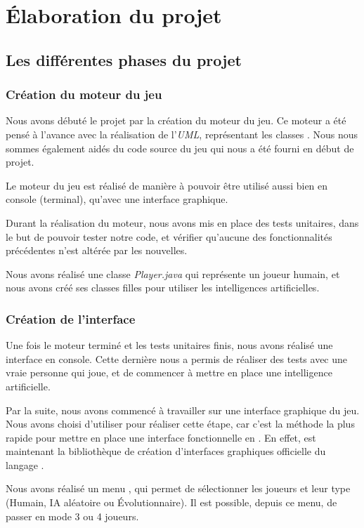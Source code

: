 \section{Élaboration du projet}

\subsection{Les différentes phases du projet}
	\subsubsection{Création du moteur du jeu}
		
		Nous avons débuté le projet par la création du moteur du jeu.
		Ce moteur a été pensé à l'avance avec la réalisation de l'\emph{UML},
		représentant les classes \java.
		Nous nous sommes également aidés du code source du jeu qui nous a été fourni
		en début de projet.
		
		Le moteur du jeu est réalisé de manière à pouvoir être utilisé aussi bien en
		console (terminal), qu'avec une interface graphique.
		
		Durant la réalisation du moteur, nous avons mis en place des tests unitaires,
		dans le but de pouvoir tester notre code, et vérifier qu'aucune des
		fonctionnalités précédentes n'est altérée par les nouvelles.
		
		Nous avons réalisé une classe \emph{Player.java} qui représente un joueur humain,
		et nous avons créé ses classes filles pour utiliser les intelligences artificielles.
		
	\subsubsection{Création de l'interface}
	
		Une fois le moteur terminé et les tests unitaires finis, nous avons réalisé une interface en console.
		Cette dernière nous a permis de réaliser des tests avec une vraie personne qui joue, et de 
		commencer à mettre en place une intelligence artificielle.
		
		Par la suite, nous avons commencé à travailler sur une interface graphique
		du jeu. Nous avons choisi d'utiliser \fx pour réaliser cette étape, car c'est
		la méthode la plus rapide pour mettre en place une interface fonctionnelle en \java.
		En effet, \fx est maintenant la bibliothèque de création d'interfaces graphiques officielle du langage \java.
		
		Nous avons réalisé un menu , qui permet de sélectionner les joueurs et leur type (Humain, IA aléatoire ou Évolutionnaire). Il est possible, depuis ce menu, de passer en mode 3 ou 4 joueurs.
		
